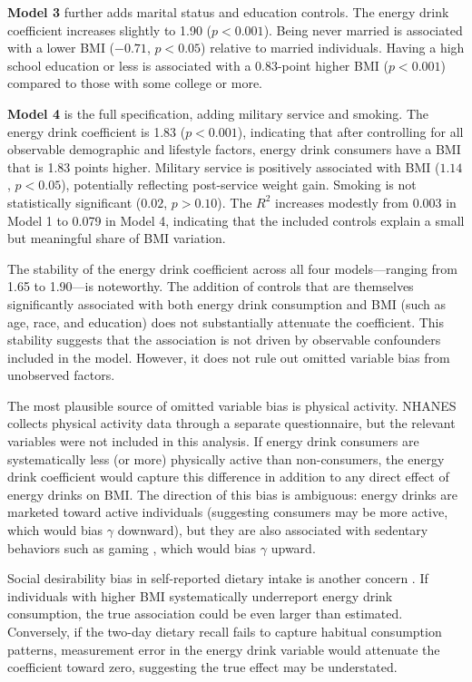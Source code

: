 \documentclass[12pt]{article}
\begin{document}
\textbf{Model 3} further adds marital status and education controls. The energy drink coefficient increases slightly to 1.90 ($p < 0.001$). Being never married is associated with a lower BMI ($-0.71$, $p < 0.05$) relative to married individuals. Having a high school education or less is associated with a 0.83-point higher BMI ($p < 0.001$) compared to those with some college or more.

\textbf{Model 4} is the full specification, adding military service and smoking. The energy drink coefficient is 1.83 ($p < 0.001$), indicating that after controlling for all observable demographic and lifestyle factors, energy drink consumers have a BMI that is 1.83 points higher. Military service is positively associated with BMI ($1.14$, $p < 0.05$), potentially reflecting post-service weight gain. Smoking is not statistically significant ($0.02$, $p > 0.10$). The $R^2$ increases modestly from 0.003 in Model 1 to 0.079 in Model 4, indicating that the included controls explain a small but meaningful share of BMI variation.

The stability of the energy drink coefficient across all four models---ranging from 1.65 to 1.90---is noteworthy. The addition of controls that are themselves significantly associated with both energy drink consumption and BMI (such as age, race, and education) does not substantially attenuate the coefficient. This stability suggests that the association is not driven by observable confounders included in the model. However, it does not rule out omitted variable bias from unobserved factors.

The most plausible source of omitted variable bias is physical activity. NHANES collects physical activity data through a separate questionnaire, but the relevant variables were not included in this analysis. If energy drink consumers are systematically less (or more) physically active than non-consumers, the energy drink coefficient would capture this difference in addition to any direct effect of energy drinks on BMI. The direction of this bias is ambiguous: energy drinks are marketed toward active individuals (suggesting consumers may be more active, which would bias $\gamma$ downward), but they are also associated with sedentary behaviors such as gaming \citep{poulos2015}, which would bias $\gamma$ upward.

Social desirability bias in self-reported dietary intake is another concern \citep{grimm2010}. If individuals with higher BMI systematically underreport energy drink consumption, the true association could be even larger than estimated. Conversely, if the two-day dietary recall fails to capture habitual consumption patterns, measurement error in the energy drink variable would attenuate the coefficient toward zero, suggesting the true effect may be understated.
\end{document}
